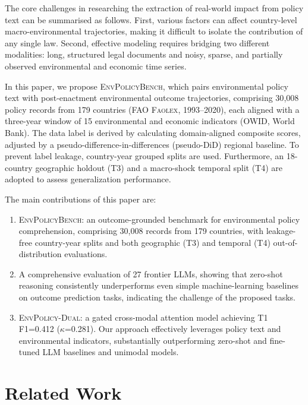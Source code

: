 \documentclass[11pt]{article}
\newcommand{\ours}{\textsc{EnvPolicy-Dual}}
\newcommand{\bench}{\textsc{EnvPolicyBench}}
\begin{document}
The core challenges in researching the extraction of real-world impact from policy text can be summarised as follows. First, various factors can affect country-level macro-environmental trajectories, making it difficult to isolate the contribution of any single law. Second, effective modeling requires bridging two different modalities: long, structured legal documents and noisy, sparse, and partially observed environmental and economic time series. 



In this paper, we propose \bench{}, which pairs environmental policy text with post-enactment environmental outcome trajectories, comprising 30{,}008 policy records from 179 countries (FAO \textsc{Faolex}, 1993--2020), each aligned with a three-year window of 15 environmental and economic indicators (OWID, World Bank). The data label is derived by calculating domain-aligned composite scores, adjusted by a pseudo-difference-in-differences (pseudo-DiD) regional baseline. To prevent label leakage, country-year grouped splits are used. Furthermore,  an 18-country geographic holdout (T3) and a macro-shock temporal split (T4) are adopted to assess generalization performance. 

The main contributions of this paper are:
\begin{enumerate}
    \item \bench: an outcome-grounded benchmark for environmental policy comprehension, comprising 30{,}008 records from 179 countries, with leakage-free country-year splits and both geographic (T3) and temporal (T4) out-of-distribution evaluations.
    \item A comprehensive evaluation of 27 frontier LLMs, showing that zero-shot reasoning consistently underperforms even simple machine-learning baselines on outcome prediction tasks, indicating the challenge of the proposed tasks.
    \item \ours: a gated cross-modal attention model achieving T1 F1=0.412 ($\kappa$=0.281). Our approach effectively leverages policy text and environmental indicators, substantially outperforming zero-shot and fine-tuned LLM baselines and unimodal models.
\end{enumerate}




\section{Related Work}
\label{sec:related}
\end{document}
